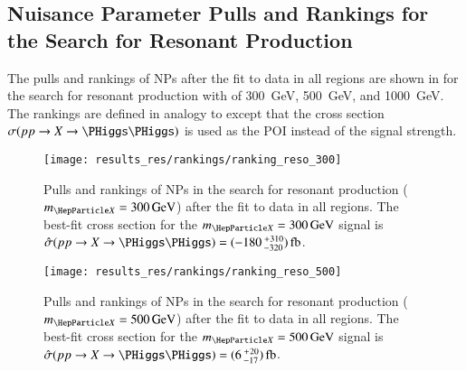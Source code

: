 
%   


\clearpage
\subsection{Nuisance Parameter Pulls and Rankings for the Search for Resonant
  \HH Production}%
\label{app:rankings_resonant}

The pulls and rankings of NPs after the fit to data in all regions are shown in
for the search for resonant \HH production with \mX of \SI{300}{\GeV},
\SI{500}{\GeV}, and \SI{1000}{\GeV}. The rankings are defined in analogy to
 except that the cross section
$\sigma(\pp \to X \to \HH)$ is used as the POI instead of the signal strength.

\begin{figure}[htbp]
  \centering

  \texttt{[image: results\_res/rankings/ranking\_reso\_300]}

  \caption{Pulls and rankings of NPs in the search for resonant \HH production
    ($\mX = \SI{300}{\GeV}$) after the fit to data in all regions. The best-fit
    cross section for the $\mX = \SI{300}{\GeV}$ signal is
    $\hat{\sigma}(\pp \to X \to \HH) =
    (\num{-180}\valuesep^{\hspace{0.25pt}+\hspace{0.25pt}310}_{-320})\valuesep\si{\femto\barn}$.}%
  \label{fig:ranking_pulls_mx300}
\end{figure}


\begin{figure}[htbp]
  \centering

  \texttt{[image: results\_res/rankings/ranking\_reso\_500]}


  \caption{Pulls and rankings of NPs in the search for resonant \HH production
    ($\mX = \SI{500}{\GeV}$) after the fit to data in all regions. The best-fit
    cross section for the $\mX = \SI{500}{\GeV}$ signal is
    $\hat{\sigma}(\pp \to X \to \HH) =
    (\num{6}\valuesep^{\hspace{0.25pt}+\hspace{0.25pt}20}_{-17})\valuesep\si{\femto\barn}$.}%
  \label{fig:ranking_pulls_mx500}
\end{figure}


